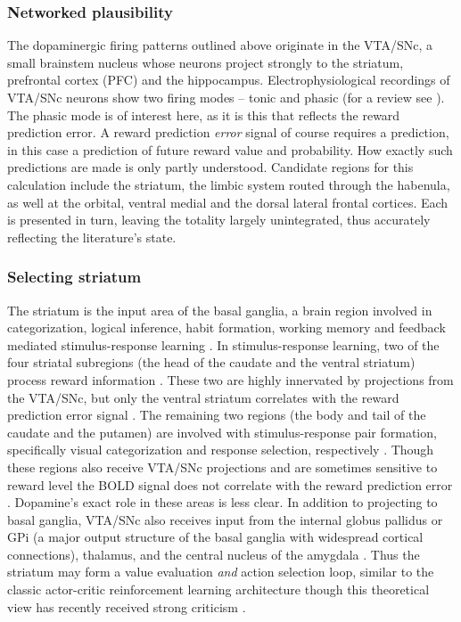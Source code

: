 \subsubsection{Networked plausibility}
\label{subsub:plausibility}
The dopaminergic firing patterns outlined above originate in the VTA/SNc, a small brainstem nucleus whose neurons project strongly to the striatum, prefrontal cortex (PFC) and the hippocampus.  Electrophysiological recordings of VTA/SNc neurons show two firing modes -- tonic and phasic (for a review see \citet{schultz:2007aa}).  The phasic mode is of interest here, as it is this that reflects the reward prediction error.  A reward prediction \emph{error} signal of course requires a prediction, in this case a prediction of future reward value and probability.  How exactly such predictions are made is only partly understood.  Candidate regions for this calculation include the striatum, the limbic system routed through the habenula, as well at the orbital, ventral medial and the dorsal lateral frontal cortices.  Each is presented in turn, leaving the totality largely unintegrated, thus accurately reflecting the literature's state.

\subsubsection{Selecting striatum}
\label{subsub:selstr}
The striatum is the input area of the basal ganglia, a brain region involved in categorization, logical inference, habit formation, working memory and feedback mediated stimulus-response learning \citep{Frank:2001p1996,Jin:2010p7199,SchmitzerTorbert:2004p5410,Seger:2008p6401,Seger:2010p7189,Yin:2006p5080}.  In stimulus-response learning, two of the four striatal subregions (the head of the caudate and the ventral striatum) process reward information \citep{Yin:2005p5101,Yin:2008p6347,Schonberg:2009p6669}.  These two are highly innervated by projections from the VTA/SNc, but only the ventral striatum correlates with the reward prediction error signal \citep{Haruno:2006p3979,Seger:2010p7189}.  The remaining two regions (the body and tail of the caudate and the putamen) are involved with stimulus-response pair formation, specifically visual categorization and response selection, respectively \citep{Seger:2008p6401,Seger:2010p7189}.  Though these regions also receive VTA/SNc projections and are sometimes sensitive to reward level \citep{BischoffGrethe:2009p4570} the BOLD signal does not correlate with the reward prediction error \citep{Seger:2010p7189}.  Dopamine's exact role in these areas is less clear.  In addition to projecting to basal ganglia, VTA/SNc also receives input from the internal globus pallidus or GPi (a major output structure of the basal ganglia with widespread cortical connections), thalamus, and the central nucleus of the amygdala \citep{Botvinick:2008p6594}.   Thus the striatum may form a value evaluation \emph{and} action selection loop, similar to the classic actor-critic reinforcement learning architecture \citep{Bornstein:2011p7996,Ito:2011p8146} though this theoretical view has recently received strong criticism \citep{Joel:2002p6593}.

